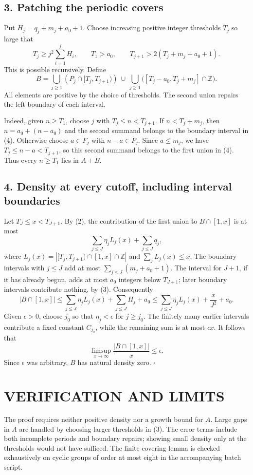 \subsection{3. Patching the periodic covers}
Put $H_j=q_j+m_j+a_0+1$. Choose increasing positive integer thresholds
$T_j$ so large that
\[
 T_j\geq j^2\sum_{i=1}^jH_i,\qquad T_1>a_0,
 \qquad T_{j+1}>2(T_j+m_j+a_0+1).                     \tag{3}
\]
This is possible recursively. Define
\[
 B=\bigcup_{j\geq1}\left(
       P_j\cap[T_j,T_{j+1})\right)
   \ \cup\ \bigcup_{j\geq1}
       \bigl([T_j-a_0,T_j+m_j]\cap\mathbb Z\bigr).    \tag{4}
\]
All elements are positive by the choice of thresholds. The second union
repairs the left boundary of each interval.

Indeed, given $n\geq T_1$, choose $j$ with $T_j\leq n<T_{j+1}$.
If $n<T_j+m_j$, then $n=a_0+(n-a_0)$ and the second summand belongs
to the boundary interval in (4). Otherwise choose $a\in F_j$ with
$n-a\in P_j$. Since $a\leq m_j$, we have
$T_j\leq n-a<T_{j+1}$, so this second summand belongs to the first
union in (4). Thus every $n\geq T_1$ lies in $A+B$.

\subsection{4. Density at every cutoff, including interval boundaries}
Let $T_J\leq x<T_{J+1}$. By (2), the contribution of the first union
to $B\cap[1,x]$ is at most
\[
 \sum_{j\leq J}\eta_j L_j(x)+\sum_{j\leq J}q_j,
\]
where $L_j(x)=|[T_j,T_{j+1})\cap[1,x]\cap\mathbb Z|$ and
$\sum_jL_j(x)\leq x$. The boundary intervals with $j\leq J$ add at
most $\sum_{j\leq J}(m_j+a_0+1)$. The interval for $J+1$, if it has
already begun, adds at most $a_0$ integers below $T_{J+1}$; later
boundary intervals contribute nothing, by (3). Consequently
\[
 |B\cap[1,x]|\leq\sum_{j\leq J}\eta_j L_j(x)
                   +\sum_{j\leq J}H_j+a_0
 \leq\sum_{j\leq J}\eta_j L_j(x)+\frac{x}{J^2}+a_0.
\]
Given $\epsilon>0$, choose $j_0$ so that $\eta_j<\epsilon$ for
$j\geq j_0$. The finitely many earlier intervals contribute a fixed
constant $C_{j_0}$, while the remaining sum is at most $\epsilon x$.
It follows that
\[
 \limsup_{x\to\infty}\frac{|B\cap[1,x]|}{x}\leq\epsilon.
\]
Since $\epsilon$ was arbitrary, $B$ has natural density zero.
\hfill$\square$

\section{VERIFICATION AND LIMITS}
The proof requires neither positive density nor a growth bound for $A$.
Large gaps in $A$ are handled by choosing larger thresholds in (3).
The error terms include both incomplete periods and boundary repairs;
showing small density only at the thresholds would not have sufficed.
The finite covering lemma is checked exhaustively on cyclic groups
of order at most eight in the accompanying batch script.


